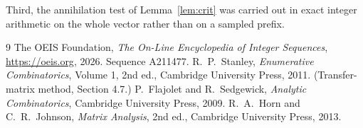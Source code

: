 \documentclass[11pt,a4paper]{article}
\theoremstyle{plain}
\theoremstyle{definition}
\begin{document}
Third, the annihilation test of Lemma~\ref{lem:crit} was carried out in exact integer
arithmetic on the whole vector rather than on a sampled prefix.

\begin{thebibliography}{9}
 The OEIS Foundation, \emph{The On-Line Encyclopedia of Integer
Sequences}, \url{https://oeis.org}, 2026. Sequence A211477.
 R.~P.~Stanley, \emph{Enumerative Combinatorics}, Volume 1, 2nd ed.,
Cambridge University Press, 2011. (Transfer-matrix method, Section 4.7.)
 P.~Flajolet and R.~Sedgewick, \emph{Analytic Combinatorics}, Cambridge
University Press, 2009.
 R.~A.~Horn and C.~R.~Johnson, \emph{Matrix Analysis}, 2nd ed., Cambridge
University Press, 2013.
\end{thebibliography}
\end{document}
